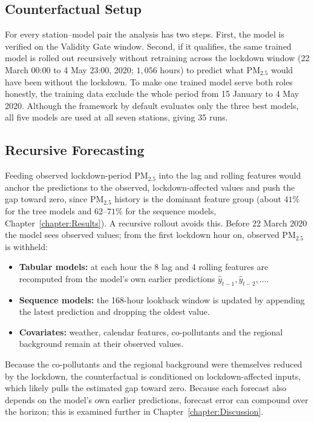 \subsection{Counterfactual Setup}
\label{subsection:counterfactual-setup}
For every station--model pair the analysis has two steps. First, the model is verified on the Validity Gate window. Second, if it qualifies, the same trained model is rolled out recursively without retraining across the lockdown window (22 March 00:00 to 4 May 23:00, 2020; $1{,}056$ hours) to predict what PM$_{2.5}$ would have been without the lockdown. To make one trained model serve both roles honestly, the training data exclude the whole period from 15 January to 4 May 2020. Although the framework by default evaluates only the three best models, all five models are used at all seven stations, giving 35 runs.

\subsection{Recursive Forecasting}
\label{subsection:recursive-forecasting}
Feeding observed lockdown-period PM$_{2.5}$ into the lag and rolling features would anchor the predictions to the observed, lockdown-affected values and push the gap toward zero, since PM$_{2.5}$ history is the dominant feature group (about $41\%$ for the tree models and $62$--$71\%$ for the sequence models, Chapter~\ref{chapter:Results}). A recursive rollout avoids this. Before 22 March 2020 the model sees observed values; from the first lockdown hour on, observed PM$_{2.5}$ is withheld:
\begin{itemize}
    \item \textbf{Tabular models:} at each hour the 8 lag and 4 rolling features are recomputed from the model's own earlier predictions $\hat{y}_{t-1}, \hat{y}_{t-2}, \dots$.
    \item \textbf{Sequence models:} the 168-hour lookback window is updated by appending the latest prediction and dropping the oldest value.
    \item \textbf{Covariates:} weather, calendar features, co-pollutants and the regional background remain at their observed values.
\end{itemize}
Because the co-pollutants and the regional background were themselves reduced by the lockdown, the counterfactual is conditioned on lockdown-affected inputs, which likely pulls the estimated gap toward zero. Because each forecast also depends on the model's own earlier predictions, forecast error can compound over the horizon; this is examined further in Chapter~\ref{chapter:Discussion}.

